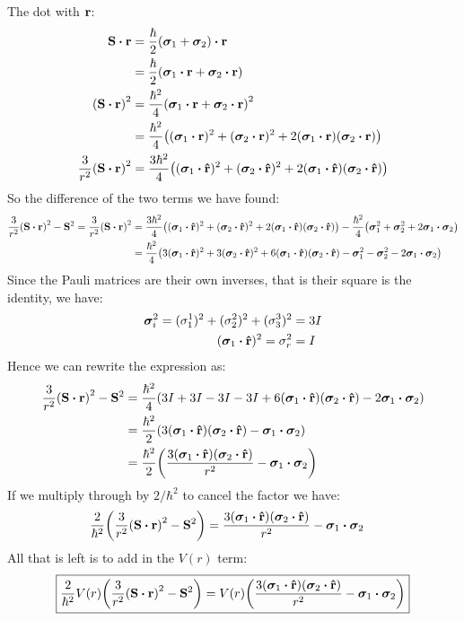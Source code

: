 \documentclass[12pt]{article}
\begin{document}
The dot with $\vb{r}$:
\begin{align*}
  \vb{S}\vdot\vb{r}&=\frac{\hbar}{2}\qty(\bm\sigma_1+\bm\sigma_2)\vdot\vb{r}\\
  &=\frac{\hbar}{2}\qty(\bm\sigma_1\vdot\vb{r}+\bm\sigma_2\vdot\vb{r})\\
  \qty(\vb{S}\vdot\vb{r})^2&=
  \frac{\hbar^2}{4}\qty(\bm\sigma_1\vdot\vb{r}+\bm\sigma_2\vdot\vb{r})^2\\
  &=\frac{\hbar^2}{4}\qty(
  (\bm\sigma_1\vdot\vb{r})^2+(\bm\sigma_2\vdot\vb{r})^2
  +2(\bm\sigma_1\vdot\vb{r})(\bm\sigma_2\vdot\vb{r}))\\
  \frac{3}{r^2}\qty(\vb{S}\vdot\vb{r})^2&=\frac{3\hbar^2}{4}\qty(
  (\bm\sigma_1\vdot\vu{r})^2+(\bm\sigma_2\vdot\vu{r})^2
  +2(\bm\sigma_1\vdot\vu{r})(\bm\sigma_2\vdot\vu{r}))
\end{align*}
So the difference of the two terms we have found:
\begin{align*}
  \frac{3}{r^2}\qty(\vb{S}\vdot\vb{r})^2-\vb{S}^2=
  \frac{3}{r^2}\qty(\vb{S}\vdot\vb{r})^2&=
  \frac{3\hbar^2}{4}\qty(
  (\bm\sigma_1\vdot\vu{r})^2+(\bm\sigma_2\vdot\vu{r})^2
  +2(\bm\sigma_1\vdot\vu{r})(\bm\sigma_2\vdot\vu{r}))
  -\frac{\hbar^2}{4}
  \qty(\bm\sigma_1^2+\bm\sigma_2^2+2\bm\sigma_1\vdot\bm\sigma_2)\\
  &=\frac{\hbar^2}{4}\qty(
  3(\bm\sigma_1\vdot\vu{r})^2+3(\bm\sigma_2\vdot\vu{r})^2
  +6(\bm\sigma_1\vdot\vu{r})(\bm\sigma_2\vdot\vu{r})-
  \bm\sigma_1^2-\bm\sigma_2^2-2\bm\sigma_1\vdot\bm\sigma_2)
\end{align*}
Since the Pauli matrices are their own inverses, that is their square is the identity, we have:
\begin{align*}
  \bm\sigma_{i}^2=(\sigma_1^1)^2+(\sigma_2^2)^2+(\sigma_3^3)^2&=3I\\
  (\bm\sigma_1\vdot\vu{r})^2=\sigma_{r}^2&=I
\end{align*}
Hence we can rewrite the expression as:
\begin{align*}
  \frac{3}{r^2}\qty(\vb{S}\vdot\vb{r})^2-\vb{S}^2&=
  \frac{\hbar^2}{4}\qty(3I+3I-3I-3I
  +6(\bm\sigma_1\vdot\vu{r})(\bm\sigma_2\vdot\vu{r})
  -2\bm\sigma_1\vdot\bm\sigma_2)\\
  &=\frac{\hbar^2}{2}\qty(
  3(\bm\sigma_1\vdot\vu{r})(\bm\sigma_2\vdot\vu{r})
  -\bm\sigma_1\vdot\bm\sigma_2)\\
  &=\frac{\hbar^2}2\qty(
  \frac{3(\bm\sigma_1\vdot\vu{r})(\bm\sigma_2\vdot\vu{r})}{r^2}
  -\bm\sigma_1\vdot\bm\sigma_2)
\end{align*}
If we multiply through by $2/\hbar^2$ to cancel the factor we have:
\begin{align*}
  \frac2{\hbar^2}\qty(\frac{3}{r^2}\qty(\vb{S}\vdot\vb{r})^2-\vb{S}^2)&=
  \frac{3(\bm\sigma_1\vdot\vu{r})(\bm\sigma_2\vdot\vu{r})}{r^2}
  -\bm\sigma_1\vdot\bm\sigma_2
\end{align*}
All that is left is to add in the $V(r)$ term:
\begin{align}
  \boxed{
    \frac2{\hbar^2}V(r)\qty(\frac{3}{r^2}\qty(\vb{S}\vdot\vb{r})^2-\vb{S}^2)=
    V(r)\qty(\frac{3(\bm\sigma_1\vdot\vu{r})(\bm\sigma_2\vdot\vu{r})}{r^2}
    -\bm\sigma_1\vdot\bm\sigma_2)}
\end{align}
\end{document}
